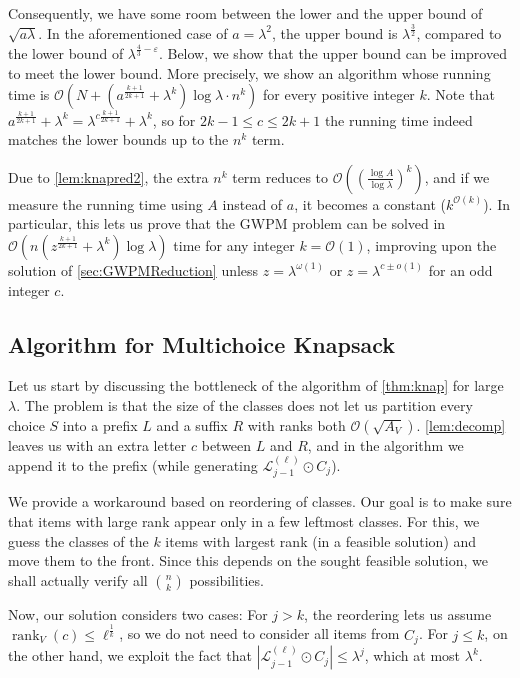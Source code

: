 \documentclass{article}
\theoremstyle{plain}
\theoremstyle{definition}
\newcommand{\GWPM}{\textsc{GWPM}\xspace}
\newcommand{\Oh}{\mathcal{O}}
\renewcommand{\L}{\mathcal{L}}
\DeclareMathOperator*{\rank}{rank}
\begin{document}
  Consequently, we have some room between the lower and the upper bound of $\sqrt{a \lambda}$.
	In the aforementioned case of $a=\lambda^2$, the upper bound is $\lambda^{\frac32}$,
	compared to the lower bound of $\lambda^{\frac43-\varepsilon}$.
	Below, we show that the upper bound can be improved to meet the lower bound.
	More precisely, we show an algorithm whose running time is $\Oh(N + (a^{\frac{k+1}{2k+1}}+\lambda^k)\log\lambda \cdot n^k)$
	for every positive integer $k$.
	Note that $a^{\frac{k+1}{2k+1}}+\lambda^k = \lambda^{c\frac{k+1}{2k+1}}+ \lambda^k$, so for $2k-1\le c \le 2k+1$ the running time indeed matches the lower bounds up to the $n^k$ term.
	
	
    Due to \cref{lem:knapred2}, the extra $n^k$ term reduces to $\Oh((\frac{\log A}{\log \lambda})^k)$,
    and if we measure the running time using $A$ instead of $a$, it becomes a constant ($k^{\Oh(k)}$).
    In particular, this lets us prove that the \GWPM problem can be solved in $\Oh(n(z^{\frac{k+1}{2k+1}}+\lambda^k)\log\lambda)$ time
    for any integer $k=\Oh(1)$, improving upon the solution of \cref{sec:GWPMReduction}
    unless $z=\lambda^{\omega(1)}$ or $z=\lambda^{c\pm o(1)}$ for an odd integer $c$.
    

    \subsection{Algorithm for Multichoice Knapsack}\label{app:fastmk}    
	Let us start by discussing the bottleneck of the algorithm of \cref{thm:knap} for large $\lambda$.
	The problem is that the size of the classes does not let us partition every choice $S$ into a prefix $L$ and a suffix $R$
	with ranks both $\Oh(\sqrt{A_V})$. \cref{lem:decomp} leaves us with an extra letter $c$ between $L$ and $R$,
	and in the algorithm we append it to the prefix (while generating $\L_{j-1}^{(\ell)}\odot C_j$).

    We provide a workaround based on reordering of classes.
    Our goal is to make sure that items with large rank appear only in a few leftmost classes.
    For this, we guess the classes of the $k$ items with largest rank (in a feasible solution) and move them to the front.
    Since this depends on the sought feasible solution, we shall actually verify all $\binom{n}{k}$ possibilities.
    
    Now, our solution considers two cases:
    For $j>k$, the reordering lets us assume $\rank_V(c)\le \ell^{\frac{1}{k}}$, so we do not need
    to consider all items from $C_j$.
    For $j\le k$, on the other hand, we exploit the fact that $|\L_{j-1}^{(\ell)}\odot C_j|\le \lambda^{j}$,
    which at most $\lambda^k$.
         
\end{document}
